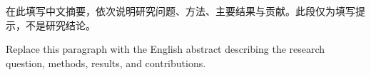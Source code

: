 \begin{cabstract}
在此填写中文摘要，依次说明研究问题、方法、主要结果与贡献。此段仅为填写提示，不是研究结论。
\end{cabstract}
\begin{eabstract}
Replace this paragraph with the English abstract describing the research question, methods, results, and contributions.
\end{eabstract}
